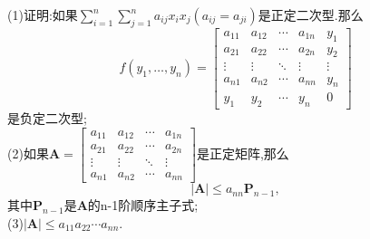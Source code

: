 \documentclass[lang=cn,11pt,normal]{elegantbook}
\renewcommand{\AA}{\boldsymbol{A}}
\newcommand{\PP}{\boldsymbol{P}}
\begin{document}
	\begin{exercise}
		(1)证明:如果${\displaystyle \sum^n_{i=1}\sum^n_{j=1}}a_{ij}x_ix_j(a_{ij}=a_{ji})$是正定二次型.那么
		\begin{equation}
		f(y_1,\dots,y_n)=
		\begin{bmatrix}
		a_{11}&a_{12}&\cdots&a_{1n}&y_1\\
		a_{21}&a_{22}&\cdots&a_{2n}&y_2\\
		\vdots&\vdots&\ddots&\vdots&\vdots\\
		a_{n1}&a_{n2}&\cdots&a_{nn}&y_n\\
		y_1&y_2&\cdots&y_n&0
		\end{bmatrix}
		\end{equation}
		是负定二次型;\\
		(2)如果$\AA=
		\begin{bmatrix}
		a_{11}&a_{12}&\cdots&a_{1n}\\
		a_{21}&a_{22}&\cdots&a_{2n}\\
		\vdots&\vdots&\ddots&\vdots\\
		a_{n1}&a_{n2}&\cdots&a_{nn}
		\end{bmatrix}
		$是正定矩阵,那么
		\begin{equation}
		|\AA|\leq a_{nn}\PP_{n-1},
		\end{equation}
		其中$\PP_{n-1}$是$\AA$的n-1阶顺序主子式;\\
		(3)$|\AA|\leq a_{11}a_{22}\cdots a_{nn}.$
	\end{exercise}
\end{document}
